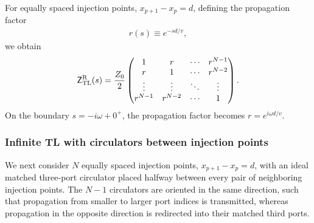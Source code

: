 \documentclass[prx,aps,twocolumn,article]{revtex4-2}
\newcommand{\msf}[1]{\mathsf{#1}}
\newcommand{\msZ}{\msf{Z}}
\newcommand{\msZTL}{\msZ_{\mathrm{TL}}}
\begin{document}
For equally spaced injection points, $x_{p+1}-x_p=d$, defining the propagation factor
\begin{align}
    r(s)\equiv e^{-sd/v},
    \label{Eq:PropagationFactorTL}
\end{align}
we obtain
\begin{align}
    \msZTL^{\rm R}(s)
    =
    \frac{Z_0}{2}
    \begin{pmatrix}
        1&r&\cdots&r^{N-1}\\
        r&1&\cdots&r^{N-2}\\
        \vdots&\vdots&\ddots&\vdots\\
        r^{N-1}&r^{N-2}&\cdots&1
    \end{pmatrix}.
    \label{Eq:InfiniteTLNPortEquallySpaced}
\end{align}
On the boundary $s=-i\omega+0^+$, the propagation factor becomes
$r=e^{i\omega d/v}$.


\subsubsection{Infinite TL with circulators between injection points}

We next consider $N$ equally spaced injection points, $x_{p+1}-x_p=d$, with an ideal matched three-port circulator placed halfway between every pair of neighboring injection points. The $N-1$ circulators are oriented in the same direction, such that propagation from smaller to larger port indices is transmitted, whereas propagation in the opposite direction is redirected into their matched third ports.
\end{document}

